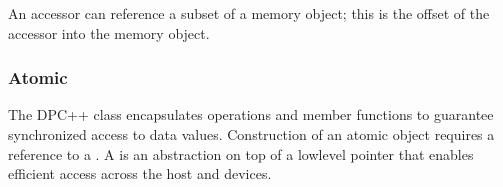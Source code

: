 \documentclass[letterpaper,10pt,english]{sphinxmanual}
\begin{document}
An accessor can reference a subset of a memory object; this is the
offset of the accessor into the memory object.


\subsubsection{Atomic}
\label{\detokenize{programming-interface/data/atomic:atomic}}\label{\detokenize{programming-interface/data/atomic:id1}}\label{\detokenize{programming-interface/data/atomic::doc}}
The DPC++  class encapsulates operations and member
functions to guarantee synchronized access to data
values. Construction of an atomic object requires a reference to a
{\hyperref[\detokenize{programming-interface/data/multi-pointer:multi-pointer}]{}}. A  is an abstraction on top of a
low\sphinxhyphen{}level pointer that enables efficient access across the host and
devices.
\end{document}

